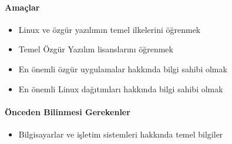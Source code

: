 \documentclass[10pt,a5paper]{book}
\begin{document}
\paragraph{Amaçlar}{
\begin{itemize}
 \item Linux ve özgür yazılımın temel ilkelerini öğrenmek
 \item Temel Özgür Yazılım lisanslarını öğrenmek
 \item En önemli özgür uygulamalar hakkında bilgi sahibi olmak
 \item En önemli Linux dağıtımları hakkında bilgi sahibi olmak
 \end{itemize}}
 
\paragraph{Önceden Bilinmesi Gerekenler}
\begin{itemize}
 \item Bilgisayarlar ve işletim sistemleri hakkında temel bilgiler
 \end{itemize}
\end{document}
